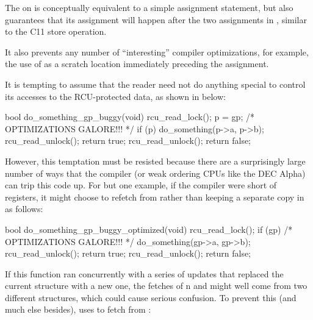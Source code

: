 \begin{fcvref}
The  on  %
is conceptually equivalent to a
simple assignment statement, but also guarantees that its assignment
will happen after the two assignments in , %
similar to the
C11  store operation.
\end{fcvref}
It also prevents any
number of ``interesting'' compiler optimizations, for example, the use of
 as a scratch location immediately preceding the assignment.

\QuickQuizEnd

It is tempting to assume that the reader need not do anything special to
control its accesses to the RCU-protected data, as shown in
 below:

\begin{VerbatimN}
	bool do_something_gp_buggy(void)
	{
		rcu_read_lock();
		p = gp;  /* OPTIMIZATIONS GALORE!!! */
		if (p) {
			do_something(p->a, p->b);
			rcu_read_unlock();
			return true;
		}
		rcu_read_unlock();
		return false;
	}
\end{VerbatimN}

However, this temptation must be resisted because there are a
surprisingly large number of ways that the compiler (or weak ordering
CPUs like the DEC Alpha) can trip this code up.
For but one example, if
the compiler were short of registers, it might choose to refetch from
 rather than keeping a separate copy in~ as follows:

\begin{VerbatimN}
	bool do_something_gp_buggy_optimized(void)
	{
		rcu_read_lock();
		if (gp) { /* OPTIMIZATIONS GALORE!!! */
			do_something(gp->a, gp->b);
			rcu_read_unlock();
			return true;
		}
		rcu_read_unlock();
		return false;
	}
\end{VerbatimN}

If this function ran concurrently with a series of updates that replaced
the current structure with a new one, the fetches of n and
 might well come from two different structures, which could
cause serious confusion.
To prevent this (and much else besides),
 uses  to fetch from :

